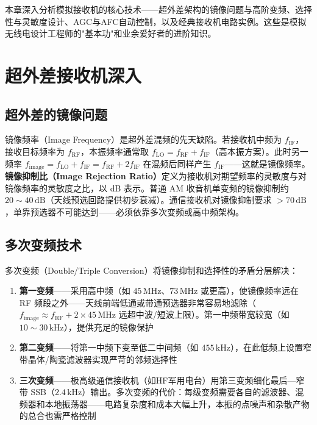\documentclass[12pt,UTF8]{ctexbook}
\begin{document}
本章深入分析模拟接收机的核心技术——超外差架构的镜像问题与高阶变频、选择性与灵敏度设计、AGC与AFC自动控制，以及经典接收机电路实例。这些是模拟无线电设计工程师的"基本功"和业余爱好者的进阶知识。

\section{超外差接收机深入}
\label{sec:superhet_deep}

\subsection{超外差的镜像问题}

镜像频率（Image Frequency）是超外差混频的先天缺陷。若接收机中频为 $f_{\mathrm{IF}}$，接收目标频率为 $f_{\mathrm{RF}}$，本振频率通常取 $f_{\mathrm{LO}} = f_{\mathrm{RF}} + f_{\mathrm{IF}}$（高本振方案）。此时另一频率 $f_{\mathrm{image}} = f_{\mathrm{LO}} + f_{\mathrm{IF}} = f_{\mathrm{RF}} + 2f_{\mathrm{IF}}$ 在混频后同样产生 $f_{\mathrm{IF}}$——这就是镜像频率。\textbf{镜像抑制比（Image Rejection Ratio）}定义为接收机对期望频率的灵敏度与对镜像频率的灵敏度之比，以 dB 表示。普通 AM 收音机单变频的镜像抑制约 $20\sim40\,\mathrm{dB}$（天线预选回路提供初步衰减）。通信接收机对镜像抑制要求 $>70\,\mathrm{dB}$，单靠预选器不可能达到——必须依靠多次变频或高中频架构。

\subsection{多次变频技术}

多次变频（Double/Triple Conversion）将镜像抑制和选择性的矛盾分层解决：
\begin{enumerate}
\item \textbf{第一变频}——采用高中频（如 $45\,\mathrm{MHz}$、$73\,\mathrm{MHz}$ 或更高），使镜像频率远在 RF 频段之外——天线前端低通或带通预选器非常容易地滤除（$f_{\mathrm{image}}\approx f_{\mathrm{RF}}+2\times45\,\mathrm{MHz}$ 远超中波/短波上限）。第一中频带宽较宽（如 $10\sim30\,\mathrm{kHz}$），提供充足的镜像保护
\item \textbf{第二变频}——将第一中频下变至低二中间频（如 $455\,\mathrm{kHz}$），在此低频上设置窄带晶体/陶瓷滤波器实现严苛的邻频选择性
\item \textbf{三次变频}——极高级通信接收机（如HF军用电台）用第三变频细化最后—窄带 SSB（$2.4\,\mathrm{kHz}$）输出。多次变频的代价：每级变频需要各自的滤波器、混频器和本地振荡器——电路复杂度和成本大幅上升，本振的点噪声和杂散产物的总合也需严格控制
\end{enumerate}
\end{document}
